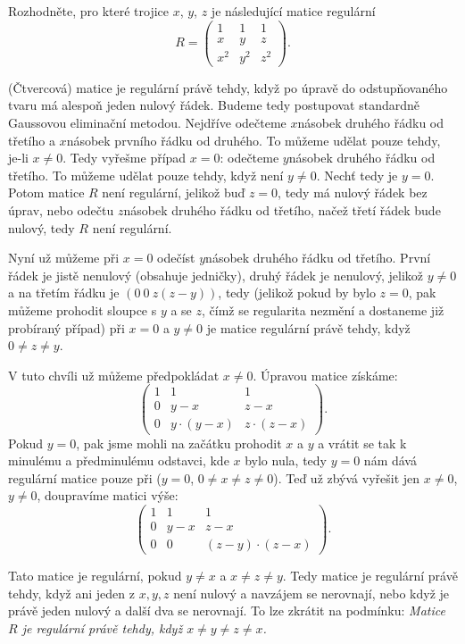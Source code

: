 \documentclass[12pt]{article}					%
\begin{document}
    \begin{priklad}[5.2]
        Rozhodněte, pro které trojice $x$, $y$, $z$ je následující matice regulární
        $$ R = \begin{pmatrix} 1 & 1 & 1 \\ x & y & z \\ x^2 & y^2 & z^2 \end{pmatrix}. $$

        \begin{reseni}
            (Čtvercová) matice je regulární právě tehdy, když po úpravě do odstupňovaného tvaru má alespoň jeden nulový řádek. Budeme tedy postupovat standardně Gaussovou eliminační metodou. Nejdříve odečteme $x$násobek druhého řádku od třetího a $x$násobek prvního řádku od druhého. To můžeme udělat pouze tehdy, je-li $x≠0$. Tedy vyřešme případ $x=0$: odečteme $y$násobek druhého řádku od třetího. To můžeme udělat pouze tehdy, když není $y≠0$. Nechť tedy je $y = 0$. Potom matice $R$ není regulární, jelikož buď $z=0$, tedy má nulový řádek bez úprav, nebo odečtu $z$násobek druhého řádku od třetího, načež třetí řádek bude nulový, tedy $R$ není regulární.

            Nyní už můžeme při $x=0$ odečíst $y$násobek druhého řádku od třetího. První řádek je jistě nenulový (obsahuje jedničky), druhý řádek je nenulový, jelikož $y≠0$ a na třetím řádku je $(0\ 0\ z(z-y))$, tedy (jelikož pokud by bylo $z=0$, pak můžeme prohodit sloupce s $y$ a se $z$, čímž se regularita nezmění a dostaneme již probíraný případ) při $x = 0$ a $y ≠ 0$ je matice regulární právě tehdy, když $0 ≠ z ≠ y$.

            V tuto chvíli už můžeme předpokládat $x ≠ 0$. Úpravou matice získáme:
            $$ \begin{pmatrix} 1 & 1 & 1 \\ 0 & y-x & z-x \\ 0 & y·(y-x) & z·(z-x) \end{pmatrix}. $$
            Pokud $y = 0$, pak jsme mohli na začátku prohodit $x$ a $y$ a vrátit se tak k minulému a předminulému odstavci, kde $x$ bylo nula, tedy $y=0$ nám dává regulární matice pouze při ($y=0$, $0≠x≠z≠0$). Teď už zbývá vyřešit jen $x ≠ 0$, $y ≠ 0$, doupravíme matici výše:
            $$ \begin{pmatrix} 1 & 1 & 1 \\ 0 & y-x & z-x \\ 0 & 0 & (z-y)·(z-x) \end{pmatrix}. $$

            Tato matice je regulární, pokud $y≠x$ a $x≠z≠y$. Tedy matice je regulární právě tehdy, když ani jeden z $x, y, z$ není nulový a navzájem se nerovnají, nebo když je právě jeden nulový a další dva se nerovnají. To lze zkrátit na podmínku: \emph{Matice $R$ je regulární právě tehdy, když $x≠y≠z≠x$.}
        \end{reseni}
    \end{priklad}
\end{document}
